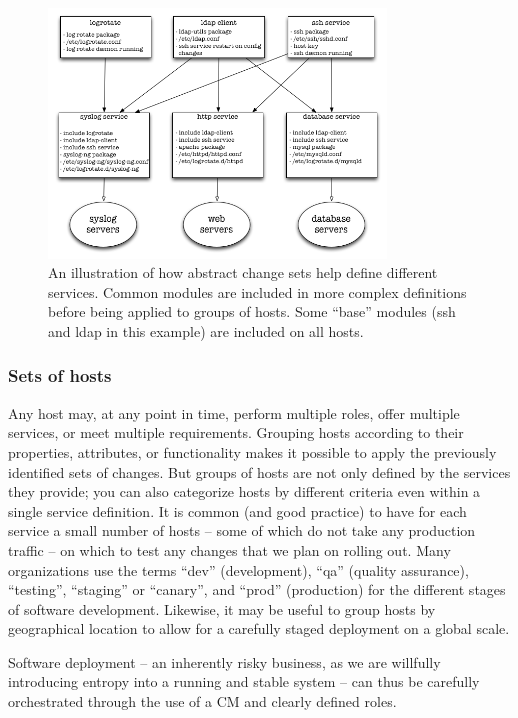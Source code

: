 \begin{figure}[!ht]
	\centering
	\includegraphics[width=0.80\textwidth]{07/pics/change-sets}
		\caption[Sets of changes applied to sets of hosts]{
			An illustration of how abstract
			change sets help define different services. Common
			modules are included in more complex definitions
			before being applied to groups of hosts.  Some
			``base'' modules (ssh and ldap in this example)
			are included on all hosts.
			\label{fig:configuration-management:change-states}}
\end{figure}

\subsubsection*{Sets of hosts}

Any host may, at any point in time, perform multiple
roles, offer multiple services, or meet multiple
requirements.  Grouping hosts according to their
properties, attributes, or functionality makes it
possible to apply the previously identified sets of
changes.  But groups of hosts are not only defined by
the services they provide; you can also categorize
hosts by different criteria even within a single
service definition.  It is common (and good practice)
to have for each service a small number of hosts --
some of which do not take any production traffic -- on
which to test any changes that we plan on rolling out.
Many organizations use the terms ``dev''
(development), ``qa'' (quality assurance),
``testing'', ``staging'' or ``canary'', and ``prod''
(production) for the different stages of software
development.  Likewise, it may be useful to group
hosts by geographical location to allow for a
carefully staged deployment on a global scale.

Software deployment -- an inherently risky business,
as we are willfully introducing entropy into a running
and stable system -- can thus be carefully
orchestrated through the use of a CM and clearly
defined roles.


